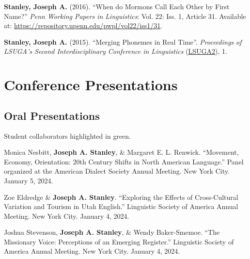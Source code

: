 \documentclass[
]{article}
\begin{document}
\textbf{Stanley, Joseph A.} (2016). ``When do Mormons Call Each Other by
First Name?'' \emph{Penn Working Papers in Linguistics}: Vol. 22: Iss.
1, Article 31. Available at:
\href{http://repository.upenn.edu/pwpl/vol22/iss1/31/}{https://repository.upenn.edu/pwpl/vol22/iss1/31}.

\textbf{Stanley, Joseph A.} (2015). ``Merging Phonemes in Real Time''.
\emph{Proceedings of LSUGA's Second Interdisciplinary Conference in
Linguistics} (\href{http://www.linguistics.uga.edu/lcuga-2}{LSUGA2}), 1.

\hypertarget{conference-presentations}{%
\section{Conference Presentations}\label{conference-presentations}}

\hypertarget{oral-presentations}{%
\subsection{Oral Presentations}\label{oral-presentations}}

\begin{tcolorbox}[enhanced jigsaw, opacityback=0, colback=white, opacitybacktitle=0.6, bottomrule=.15mm, leftrule=.75mm, toprule=.15mm, arc=.35mm, toptitle=1mm, colframe=quarto-callout-note-color-frame, breakable, titlerule=0mm, coltitle=black, colbacktitle=quarto-callout-note-color!10!white, left=2mm, bottomtitle=1mm, title=\textcolor{quarto-callout-note-color}{\faInfo}\hspace{0.5em}{Note}, rightrule=.15mm]

Student collaborators highlighted in {green}.

\end{tcolorbox}

Monica Nesbitt, \textbf{Joseph A. Stanley}, \& Margaret E. L. Renwick.
``Movement, Economy, Orientation: 20th Century Shifts in North American
Language.'' Panel organized at the American Dialect Society Annual
Meeting. New York City. January 5, 2024.

{Zoe Eldredge} \& \textbf{Joseph A. Stanley}. ``Exploring the Effects of
Cross-Cultural Variation and Tourism in Utah English.'' Linguistic
Society of America Annual Meeting. New York City. January 4, 2024.

{Joshua Stevenson}, \textbf{Joseph A. Stanley}, \& Wendy Baker-Smemoe.
``The Missionary Voice: Perceptions of an Emerging Register.''
Linguistic Society of America Annual Meeting. New York City. January 4,
2024.
\end{document}
